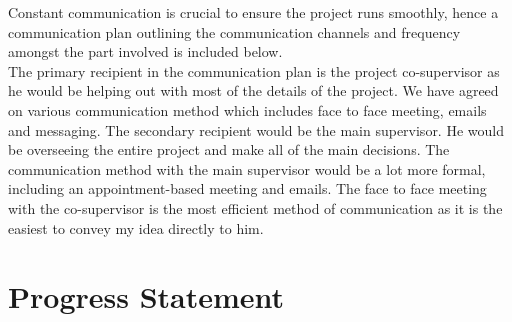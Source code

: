 \documentclass[12pt,A4]{article}
\begin{document}
	Constant communication is crucial to ensure the project runs smoothly, hence a communication plan outlining the communication channels and frequency amongst the part involved is included below.\\
	
	
	The primary recipient in the communication plan is the project co-supervisor as he would be helping out with most of the details of the project. We have agreed on various communication method which includes face to face meeting, emails and messaging. The secondary recipient would be the main supervisor. He would be overseeing the entire project and make all of the main decisions. The communication method with the main supervisor would be a lot more formal, including an appointment-based meeting and emails. The face to face meeting with the co-supervisor is the most efficient method of communication as it is the easiest to convey my idea directly to him.\\
	
	\section{Progress Statement}

	
	\pagebreak



\end{document}

